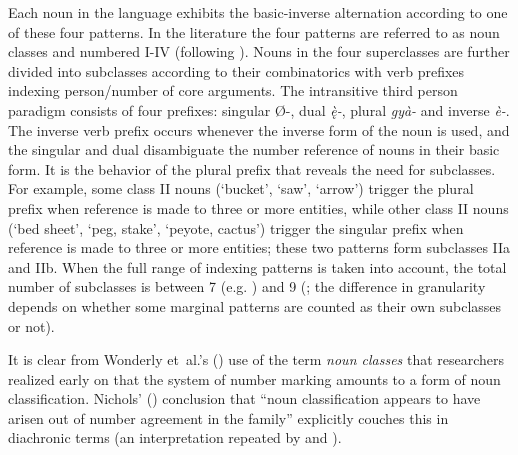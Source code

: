 \documentclass[output=collectionpaper]{langsci/langscibook}
\begin{document}
Each noun in the language exhibits the basic-inverse alternation according to one of these four patterns. In the  literature the four patterns are referred to as noun classes and numbered I-IV (following \citealt{Wonderly1954}). Nouns in the four superclasses are further divided into subclasses according to their combinatorics with verb prefixes indexing person/number of core arguments. The intransitive third person paradigm consists of four prefixes: singular Ø-, dual \textit{ę̀-}, plural \textit{gyà-} and inverse \textit{è-}. The inverse verb prefix occurs whenever the inverse form of the noun is used, and the singular and dual disambiguate the number reference of nouns in their basic form. It is the behavior of the plural prefix that reveals the need for subclasses. For example, some class II nouns (`bucket', `saw', `arrow') trigger the plural prefix when reference is made to three or more entities, while other class II nouns (`bed sheet', `peg, stake', `peyote, cactus') trigger the singular prefix when reference is made to three or more entities; these two patterns form subclasses IIa and IIb. When the full range of indexing patterns is taken into account, the total number of subclasses is between 7 (e.g. \citealt{Watkins1984}) and 9 (\citealt{Harbour2008}; the difference in granularity depends on whether some marginal patterns are counted as their own subclasses or not).

\largerpage
It is clear from Wonderly et~al.'s (\citeyear*{Wonderly1954}) use of the term \textit{noun classes} that researchers realized early on that the  system of number marking amounts to a form of noun classification. Nichols' (\citeyear[141]{Nichols1992}) conclusion that ``noun classification appears to have arisen out of number agreement in the  family'' explicitly couches this in diachronic terms (an interpretation repeated by \citealt[377]{Aikhenvald2000} and \citealt[451]{Luraghi2011}).
\end{document}
